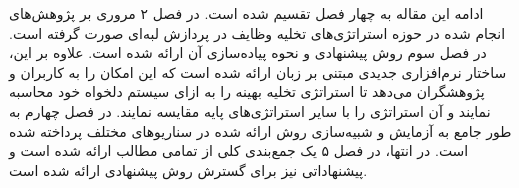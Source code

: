 ادامه این مقاله به چهار فصل تقسیم شده است. در فصل ۲ مروری بر پژوهش‌های انجام شده در حوزه استراتژی‌های تخلیه وظایف در پردازش لبه‌ای صورت گرفته است. در فصل سوم روش پیشنهادی و نحوه پیاده‌سازی آن ارائه شده است. علاوه بر این، ساختار نرم‌افزاری جدیدی مبتنی بر زبان  ارائه شده است که این امکان را به کاربران و پژوهشگران می‌دهد تا استراتژی تخلیه بهینه را به ازای سیستم دلخواه خود محاسبه نمایند و آن استراتژی را با سایر استراتژی‌های پایه مقایسه نمایند. در فصل چهارم به طور جامع به آزمایش و شبیه‌سازی روش ارائه شده در سناریوهای مختلف پرداخته شده است. در انتها، در فصل ۵ یک جمع‌بندی کلی از تمامی مطالب ارائه شده است و پیشنهاداتی نیز برای گسترش روش پیشنهادی ارائه شده است.


\newpage
